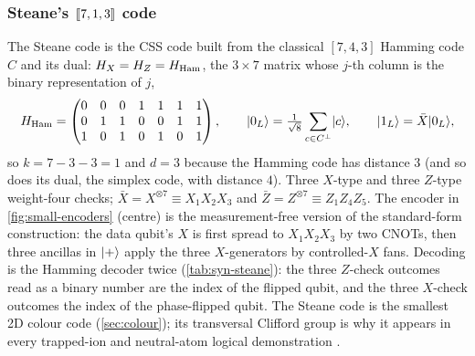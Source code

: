 \begin{table}[H]\centering\scriptsize

\caption{Shor-code lookup table (computed, ). Each $X$ error has its own syndrome; the three $Z$ errors of a block share one.}
\label{tab:syn-shor}
\end{table}

\subsubsection{Steane's $[\![7,1,3]\!]$ code}
The Steane code \cite{steane96} is the CSS code built from the classical $[7,4,3]$ Hamming code $C$ and its dual: $H_X=H_Z=H_{\rm Ham}$, the $3\times7$ matrix whose $j$-th column is the binary representation of $j$,
\[
H_{\rm Ham}=\begin{pmatrix}0&0&0&1&1&1&1\\0&1&1&0&0&1&1\\1&0&1&0&1&0&1\end{pmatrix},\qquad
\lvert 0_L \rangle=\tfrac1{\sqrt8}\sum_{c\in C^\perp}\lvert c \rangle,\qquad \lvert 1_L \rangle=\bar X\lvert 0_L \rangle,
\]
so $k=7-3-3=1$ and $d=3$ because the Hamming code has distance $3$ (and so does its dual, the simplex code, with distance $4$). Three $X$-type and three $Z$-type weight-four checks; $\bar X=X^{\otimes7}\equiv X_1X_2X_3$ and $\bar Z=Z^{\otimes7}\equiv Z_1Z_4Z_5$. The encoder in \cref{fig:small-encoders} (centre) is the measurement-free version of the standard-form construction: the data qubit's $X$ is first spread to $X_1X_2X_3$ by two CNOTs, then three ancillas in $\lvert + \rangle$ apply the three $X$-generators by controlled-$X$ fans. Decoding is the Hamming decoder twice (\cref{tab:syn-steane}): the three $Z$-check outcomes read as a binary number are the index of the flipped qubit, and the three $X$-check outcomes the index of the phase-flipped qubit. The Steane code is the smallest 2D colour code (\cref{sec:colour}); its transversal Clifford group is why it appears in every trapped-ion and neutral-atom logical demonstration \cite{ryan-anderson21,bluvstein24}.

\begin{table}[H]\centering\scriptsize

\caption{Steane-code lookup table (computed): the syndrome is the binary index of the faulty qubit, for $X$ and $Z$ errors alike.}
\label{tab:syn-steane}
\end{table}

